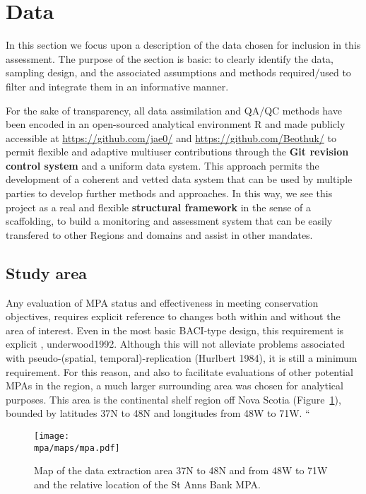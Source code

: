 \documentclass[letterpaper,portrait,11pt]{scrartcl}
\numberwithin{equation}{section}		%
\numberwithin{figure}{section}		%
\numberwithin{table}{section}				%
\newcommand*{\D}{.}
\newcommand{\biodata}{\string~/bio\D data}   %
\newcommand{\mpa}{\biodata/bio\D indicators/mpa}  %
\begin{document}
\section{Data} 

In this section we focus upon a description of the data chosen for inclusion in this assessment. The purpose of the section is basic: to clearly identify the data, sampling design, and the associated assumptions and methods required/used to filter and integrate them in an informative manner. 

For the sake of transparency, all data assimilation and QA/QC methods have been encoded in an open-sourced analytical environment R \parencite{rCran} and made publicly accessible at \url{https://github.com/jae0/} and \url{https://github.com/Beothuk/} to permit flexible and adaptive multiuser contributions through the \textbf{Git revision control system} and a uniform  data system. This approach permits the development of a coherent and vetted data system that can be used by multiple parties to develop further methods and approaches. In this way, we see this project as a real and flexible \textbf{structural framework} in the sense of a scaffolding, to build a monitoring and assessment system that can be easily transfered to other Regions and domains and assist in other mandates. 


\subsection{Study area}
Any evaluation of MPA status and effectiveness in meeting conservation objectives, requires explicit reference to changes both within and without the area of interest. Even in the most basic BACI-type design, this requirement is explicit \parencite{green:1979}, underwood1992. Although this will not alleviate problems associated with pseudo-(spatial, temporal)-replication (Hurlbert 1984), it is still a minimum requirement. For this reason, and also to facilitate evaluations of other potential MPAs in the region, a much larger surrounding area was chosen for analytical purposes. This area is the continental shelf region off Nova Scotia (Figure~\ref{fig:SAB}), bounded by latitudes 37N to 48N and longitudes from 48W to 71W.  ``

\begin{figure}[h]
  \caption{Map of the data extraction area 37N to 48N and from 48W to 71W and the relative location of the St Anns Bank MPA.}
  \label{fig:SAB}
  \centering
  \texttt{[image: \\mpa/maps/mpa.pdf]}

\end{figure}
\end{document}
